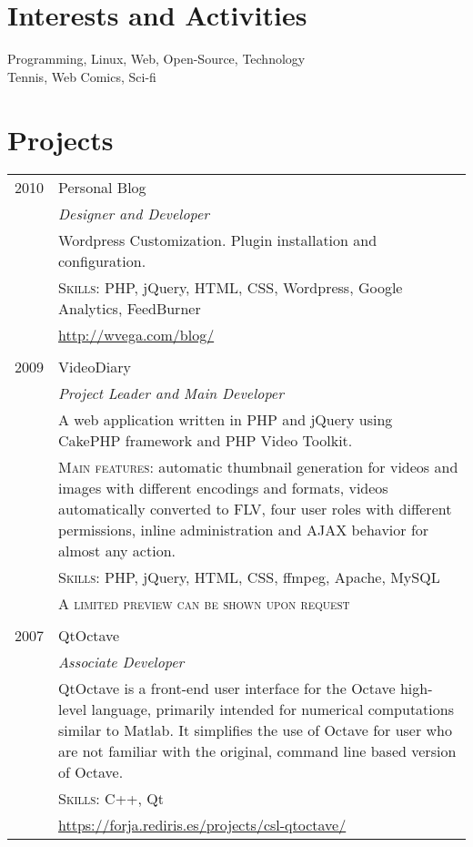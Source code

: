 \documentclass[letter,10pt]{article}
\begin{document}
\section{Interests and Activities}
Programming, Linux, Web, Open-Source, Technology\\
Tennis, Web Comics, Sci-fi\\

\newpage

\section{Projects}
\begin{tabular}{r|p{13cm}}
 \textsc{2010} & Personal Blog\\
 & \emph{Designer and Developer}\\
 & \footnotesize{Wordpress Customization. Plugin installation and configuration.}\\
 & \textsc{Skills:} PHP, jQuery, HTML, CSS, Wordpress, Google Analytics, FeedBurner\\
 & \href{http://wvega.com/blog/}{http://wvega.com/blog/}\\\multicolumn{2}{c}{} \\

 \textsc{2009} & VideoDiary\\
 & \emph{Project Leader and Main Developer}\\
 & \footnotesize{A web application written in PHP and jQuery using CakePHP framework and PHP Video Toolkit.}\\
 & \textsc{Main features:} \footnotesize{automatic thumbnail generation for videos and images with different encodings and formats, videos automatically converted to FLV, four user roles with different permissions, inline administration and AJAX behavior for almost any action.}\\
 & \textsc{Skills:} PHP, jQuery, HTML, CSS, ffmpeg, Apache, MySQL\\
 & \textsc{A limited preview can be shown upon request}\\\multicolumn{2}{c}{} \\

 \textsc{2007} & QtOctave\\
 & \emph{Associate Developer}\\
 & \footnotesize{QtOctave is a front-end user interface for the Octave high-level language, primarily intended for numerical computations similar to Matlab. It simplifies the use of Octave for user who are not familiar with the original, command line based version of Octave.}\\
 & \textsc{Skills:} C++, Qt\\
 & \href{https://forja.rediris.es/projects/csl-qtoctave/}{https://forja.rediris.es/projects/csl-qtoctave/}%
\end{tabular}
\end{document}

